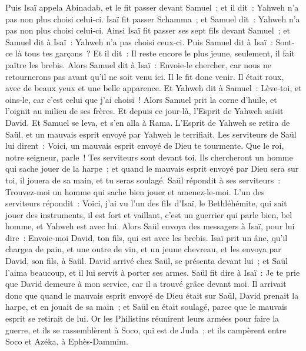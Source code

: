 \begin{multicols}{2}
Puis Isaï appela Abinadab, et le fit passer devant Samuel~; et il dit~: Yahweh n'a pas non plus choisi celui-ci.
Isaï fit passer Schamma~; et Samuel dit~: Yahweh n'a pas non plus choisi celui-ci.
Ainsi Isaï fit passer ses sept fils devant Samuel~; et Samuel dit à Isaï~: Yahweh n'a pas choisi ceux-ci.
Puis Samuel dit à Isaï~: Sont-ce là tous tes garçons~? Et il dit~: Il reste encore le plus jeune, seulement, il fait paître les brebis. Alors Samuel dit à Isaï~: Envoie-le chercher, car nous ne retournerons pas avant qu'il ne soit venu ici.
Il le fit donc venir. Il était roux, avec de beaux yeux et une belle apparence. Et Yahweh dit à Samuel~: Lève-toi, et oins-le, car c'est celui que j'ai choisi~!
Alors Samuel prit la corne d'huile, et l'oignit au milieu de ses frères. Et depuis ce jour-là, l'Esprit de Yahweh saisit David. Et Samuel se leva, et s'en alla à Rama.
L'Esprit de Yahweh se retira de Saül, et un mauvais esprit envoyé par Yahweh le terrifiait.
Les serviteurs de Saül lui dirent~: Voici, un mauvais esprit envoyé de Dieu te tourmente.
Que le roi, notre seigneur, parle~! Tes serviteurs sont devant toi. Ils chercheront un homme qui sache jouer de la harpe~; et quand le mauvais esprit envoyé par Dieu sera sur toi, il jouera de sa main, et tu seras soulagé.
Saül répondit à ses serviteurs~: Trouvez-moi un homme qui sache bien jouer et amenez-le-moi.
L'un des serviteurs répondit~: Voici, j'ai vu l'un des fils d'Isaï, le Bethléhémite, qui sait jouer des instruments, il est fort et vaillant, c'est un guerrier qui parle bien, bel homme, et Yahweh est avec lui.
Alors Saül envoya des messagers à Isaï, pour lui dire~: Envoie-moi David, ton fils, qui est avec les brebis.
Isaï prit un âne, qu'il chargea de pain, et une outre de vin, et un jeune chevreau, et les envoya par David, son fils, à Saül.
David arrivé chez Saül, se présenta devant lui~; et Saül l'aima beaucoup, et il lui servit à porter ses armes.
Saül fit dire à Isaï~: Je te prie que David demeure à mon service, car il a trouvé grâce devant moi.
Il arrivait donc que quand le mauvais esprit envoyé de Dieu était sur Saül, David prenait la harpe, et en jouait de sa main~; et Saül en était soulagé, parce que le mauvais esprit se retirait de lui.
\VerseOne{}Or les Philistins réunirent leurs armées pour faire la guerre, et ils se rassemblèrent à Soco, qui est de Juda~; et ils campèrent entre Soco et Azéka, à Ephès-Dammim.

\end{multicols}

